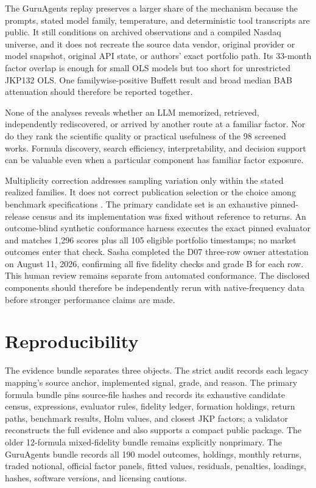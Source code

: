 \documentclass[sigconf,anonymous]{acmart}
\begin{document}
The GuruAgents replay preserves a larger share of the mechanism because the prompts, stated model family, temperature, and deterministic tool transcripts are public. It still conditions on archived observations and a compiled Nasdaq universe, and it does not recreate the source data vendor, original provider or model snapshot, original API state, or authors' exact portfolio path. Its 33-month factor overlap is enough for small OLS models but too short for unrestricted JKP132 OLS. One familywise-positive Buffett result and broad median BAB attenuation should therefore be reported together.

None of the analyses reveals whether an LLM memorized, retrieved, independently rediscovered, or arrived by another route at a familiar factor. Nor do they rank the scientific quality or practical usefulness of the 98 screened works. Formula discovery, search efficiency, interpretability, and decision support can be valuable even when a particular component has familiar factor exposure.

Multiplicity correction addresses sampling variation only within the stated realized families. It does not correct publication selection or the choice among benchmark specifications \cite{HarveyLiuZhu2016}. The primary candidate set is an exhaustive pinned-release census and its implementation was fixed without reference to returns. An outcome-blind synthetic conformance harness executes the exact pinned evaluator and matches 1,296 scores plus all 105 eligible portfolio timestamps; no market outcomes enter that check. Sasha completed the D07 three-row owner attestation on August 11, 2026, confirming all five fidelity checks and grade B for each row. This human review remains separate from automated conformance. The disclosed components should therefore be independently rerun with native-frequency data before stronger performance claims are made.

\section{Reproducibility}

The evidence bundle separates three objects. The strict audit records each legacy mapping's source anchor, implemented signal, grade, and reason. The primary formula bundle pins source-file hashes and records its exhaustive candidate census, expressions, evaluator rules, fidelity ledger, formation holdings, return paths, benchmark results, Holm values, and closest JKP factors; a validator reconstructs the full evidence and also supports a compact public package. The older 12-formula mixed-fidelity bundle remains explicitly nonprimary. The GuruAgents bundle records all 190 model outcomes, holdings, monthly returns, traded notional, official factor panels, fitted values, residuals, penalties, loadings, hashes, software versions, and licensing cautions.
\end{document}

